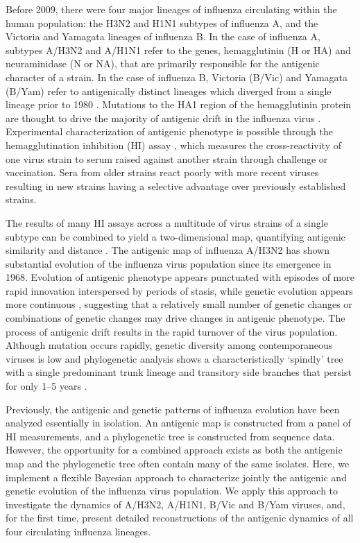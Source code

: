 \documentclass[11pt,oneside,letterpaper]{article}
\begin{document}
Before 2009, there were four major lineages of influenza circulating within the human population: the H3N2 and H1N1 subtypes of influenza A, and the Victoria and Yamagata lineages of influenza B. 
In the case of influenza A, subtypes A/H3N2 and A/H1N1 refer to the genes, hemagglutinin (H or HA) and neuraminidase (N or NA), that are primarily responsible for the antigenic character of a strain. 
In the case of influenza B, Victoria (B/Vic) and Yamagata (B/Yam) refer to antigenically distinct lineages which diverged from a single lineage prior to 1980 \cite{Rota90}.
Mutations to the HA1 region of the hemagglutinin protein are thought to drive the majority of antigenic drift in the influenza virus \cite{Wiley81, Nelson07NatRevGenet}. 
Experimental characterization of antigenic phenotype is possible through the hemagglutination inhibition (HI) assay \cite{Hirst43}, which measures the cross-reactivity of one virus strain to serum raised against another strain through challenge or vaccination. 
Sera from older strains react poorly with more recent viruses resulting in new strains having a selective advantage over previously established strains.

The results of many HI assays across a multitude of virus strains of a single subtype can be combined to yield a two-dimensional map, quantifying antigenic similarity and distance \cite{Smith04}. 
The antigenic map of influenza A/H3N2 has shown substantial evolution of the influenza virus population since its emergence in 1968. 
Evolution of antigenic phenotype appears punctuated with episodes of more rapid innovation interspersed by periods of stasis, while genetic evolution appears more continuous \cite{Smith04}, suggesting that a relatively small number of genetic changes or combinations of genetic changes may drive changes in antigenic phenotype. 
The process of antigenic drift results in the rapid turnover of the virus population. 
Although mutation occurs rapidly, genetic diversity among contemporaneous viruses is low and phylogenetic analysis shows a characteristically `spindly' tree with a single predominant trunk lineage and transitory side branches that persist for only 1--5 years \cite{Fitch97}.

Previously, the antigenic and genetic patterns of influenza evolution have been analyzed essentially in isolation. 
An antigenic map is constructed from a panel of HI measurements, and a phylogenetic tree is constructed from sequence data. 
However, the opportunity for a combined approach exists as both the antigenic map and the phylogenetic tree often contain many of the same isolates. 
Here, we implement a flexible Bayesian approach to characterize jointly the antigenic and genetic evolution of the influenza virus population. 
We apply this approach to investigate the dynamics of A/H3N2, A/H1N1, B/Vic and B/Yam viruses, and, for the first time, present detailed reconstructions of the antigenic dynamics of all four circulating influenza lineages.
\end{document}
